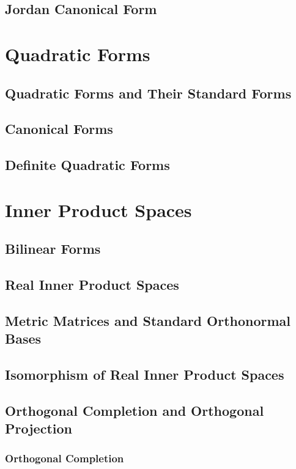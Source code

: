 \documentclass[11pt]{elegantbook}
\begin{document}
\section{Jordan Canonical Form}

\chapter{Quadratic Forms}
\section{Quadratic Forms and Their Standard Forms}
\section{Canonical Forms}
\section{Definite Quadratic Forms}


\chapter{Inner Product Spaces}
\section{Bilinear Forms}

\section{Real Inner Product Spaces}

\section{Metric Matrices and Standard Orthonormal Bases}

\section{Isomorphism of Real Inner Product Spaces}

\section{Orthogonal Completion and Orthogonal Projection}
\subsection{Orthogonal Completion}
\end{document}
